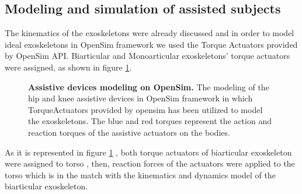 \documentclass[10pt,letterpaper]{article}
\begin{document}
\subsection*{Modeling and simulation of assisted subjects}
The kinematics of the exoskeletons were already discussed and in order to model ideal exoskeletons in OpenSim framework we used the Torque Actuators provided by OpenSim API\cite{103}. Biarticular and Monoarticular exoskeletons' torque actuators were assigned, as shown in figure \ref{Fig_Exos_Model_Opensim}.
\begin{figure}[h!]
	\centering
	\hfil
	\vspace{1mm}
	\caption{\small{\textbf{Assistive devices modeling on OpenSim.} The modeling of the hip and knee assistive devices in OpenSim framework in which TorqueActuators provided by opensim has been utilized to model the exoskeletons. The blue and red torques represent the action and reaction torques of the assistive actuators on the bodies.}}
	\label{Fig_Exos_Model_Opensim}
\end{figure}
As it is represented in figure \ref{Fig_Exos_Model_Opensim} , both torque actuators of biarticular exoskeleton were assigned to torso , then, reaction forces of the actuators were applied to the torso which is in the match with the kinematics and dynamics model of the biarticular exoskeleton.
\end{document}

